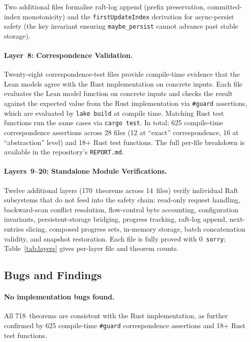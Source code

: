 \documentclass[sigconf,10pt]{acmart}
\begin{document}
Two additional files formalise
raft-log append (prefix preservation, committed-index monotonicity)
and the \texttt{firstUpdateIndex} derivation for async-persist
safety (the key invariant ensuring \texttt{maybe\_persist} cannot
advance past stable storage).

\paragraph{Layer~8: Correspondence Validation.}
Twenty-eight correspondence-test files provide compile-time evidence that the
Lean models agree with the Rust implementation on concrete inputs.  Each
file evaluates the Lean model function on concrete inputs and checks
the result against the expected value from the Rust implementation
via \texttt{\#guard} assertions, which are evaluated
by \texttt{lake build} at compile time.  Matching Rust test functions run
the same cases via \texttt{cargo test}.
In total: 625 compile-time correspondence assertions across 28 files
(12 at ``exact'' correspondence, 16 at ``abstraction'' level)
and 18+ Rust test functions.
The full per-file breakdown is available in the repository's
\texttt{REPORT.md}.

\paragraph{Layers~9--20: Standalone Module Verifications.}
Twelve additional layers (170~theorems across 14~files) verify
individual Raft subsystems that do not feed into the safety chain:
read-only request handling, backward-scan conflict resolution,
flow-control byte accounting, configuration invariants,
persistent-storage bridging, progress tracking, raft-log append,
next-entries slicing, composed progress sets, in-memory storage,
batch concatenation validity, and snapshot restoration.
Each file is fully proved with 0~\texttt{sorry};
Table~\ref{tab:layers} gives per-layer file and theorem counts.



\subsection{Bugs and Findings}
\label{sec:findings}

\paragraph{No implementation bugs found.}
All 718~theorems are consistent with the Rust implementation, as further
confirmed by 625 compile-time \texttt{\#guard} correspondence assertions
and 18+ Rust test functions.
\end{document}
